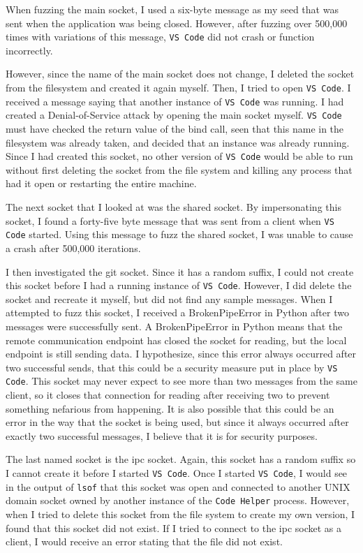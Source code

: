 When fuzzing the main socket, I used a six-byte message as my seed that was sent when the application was being closed.  However, after fuzzing over 500,000 times with variations of this message, \texttt{VS Code} did not crash or function incorrectly.

However, since the name of the main socket does not change, I deleted the socket from the filesystem and created it again myself.  Then, I tried to open \texttt{VS Code}.  I received a message saying that another instance of \texttt{VS Code} was running.  I had created a Denial-of-Service attack by opening the main socket myself.  \texttt{VS Code} must have checked the return value of the bind call, seen that this name in the filesystem was already taken, and decided that an instance was already running.  Since I had created this socket, no other version of \texttt{VS Code} would be able to run without first deleting the socket from the file system and killing any process that had it open or restarting the entire machine.

The next socket that I looked at was the shared socket.  By impersonating this socket, I found a forty-five byte message that was sent from a client when \texttt{VS Code} started.  Using this message to fuzz the shared socket, I was unable to cause a crash after 500,000 iterations.

I then investigated the git socket.  Since it has a random suffix, I could not create this socket before I had a running instance of \texttt{VS Code}.  However, I did delete the socket and recreate it myself, but did not find any sample messages.  When I attempted to fuzz this socket, I received a BrokenPipeError in Python after two messages were successfully sent.  A BrokenPipeError in Python means that the remote communication endpoint has closed the socket for reading, but the local endpoint is still sending data.  I hypothesize, since this error always occurred after two successful sends, that this could be a security measure put in place by \texttt{VS Code}.  This socket may never expect to see more than two messages from the same client, so it closes that connection for reading after receiving two to prevent something nefarious from happening.  It is also possible that this could be an error in the way that the socket is being used, but since it always occurred after exactly two successful messages, I believe that it is for security purposes.

The last named socket is the ipc socket.  Again, this socket has a random suffix so I cannot create it before I started \texttt{VS Code}.  Once I started \texttt{VS Code}, I would see in the output of \texttt{lsof} that this socket was open and connected to another UNIX domain socket owned by another instance of the \texttt{Code Helper} process.  However, when I tried to delete this socket from the file system to create my own version, I found that this socket did not exist.  If I tried to connect to the ipc socket as a client, I would receive an error stating that the file did not exist.

